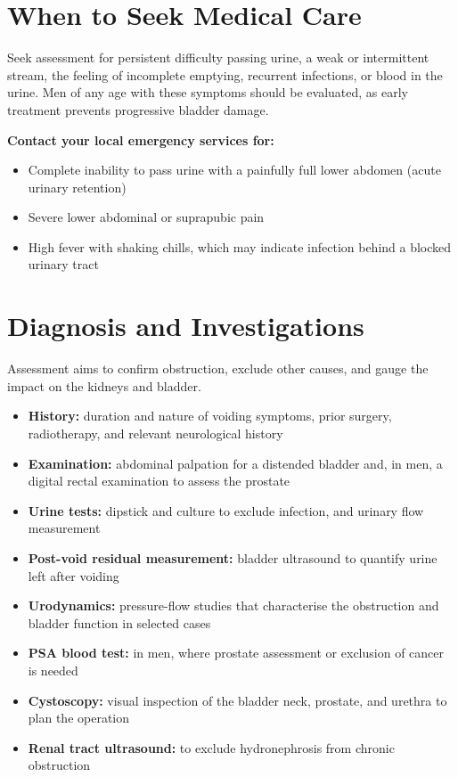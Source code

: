\section*{When to Seek Medical Care}
Seek assessment for persistent difficulty passing urine, a weak or intermittent stream, the feeling of incomplete emptying, recurrent infections, or blood in the urine. Men of any age with these symptoms should be evaluated, as early treatment prevents progressive bladder damage.

\textbf{Contact your local emergency services for:}
\begin{itemize}
    \item Complete inability to pass urine with a painfully full lower abdomen (acute urinary retention)
    \item Severe lower abdominal or suprapubic pain
    \item High fever with shaking chills, which may indicate infection behind a blocked urinary tract
\end{itemize}

\section*{Diagnosis and Investigations}
Assessment aims to confirm obstruction, exclude other causes, and gauge the impact on the kidneys and bladder.

\begin{itemize}
    \item \textbf{History:} duration and nature of voiding symptoms, prior surgery, radiotherapy, and relevant neurological history
    \item \textbf{Examination:} abdominal palpation for a distended bladder and, in men, a digital rectal examination to assess the prostate
    \item \textbf{Urine tests:} dipstick and culture to exclude infection, and urinary flow measurement
    \item \textbf{Post-void residual measurement:} bladder ultrasound to quantify urine left after voiding
    \item \textbf{Urodynamics:} pressure-flow studies that characterise the obstruction and bladder function in selected cases
    \item \textbf{PSA blood test:} in men, where prostate assessment or exclusion of cancer is needed
    \item \textbf{Cystoscopy:} visual inspection of the bladder neck, prostate, and urethra to plan the operation
    \item \textbf{Renal tract ultrasound:} to exclude hydronephrosis from chronic obstruction
\end{itemize}

